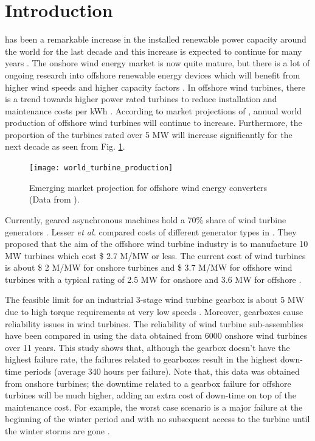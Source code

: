 \documentclass[final,peerreview,onecolumn]{IEEEtran}
\begin{document}


\section{Introduction}
 has been a remarkable increase in the installed renewable power capacity around the world for the last decade and this increase is expected to continue for many years \cite{Tong2010}. The onshore wind energy market is now quite mature, but there is a lot of ongoing research into offshore renewable energy devices which will benefit from higher wind speeds and higher capacity factors \cite{Tong2010}.  In offshore wind turbines, there is a trend towards higher power rated turbines to reduce installation and maintenance costs per kWh \cite{Bang2008}. According to market projections of \cite{offshore_wind_report2009}, annual world production of offshore wind turbines will continue to increase. Furthermore, the proportion of  the turbines rated over 5 MW will increase significantly for the next decade as seen from Fig. \ref{world_production}.

\begin{figure}[!h]
\centering
\texttt{[image: world\_turbine\_production]}
\caption{Emerging market projection for offshore wind energy converters (Data from \cite{offshore_wind_report2009}).}
\label{world_production}
\end{figure}


Currently, geared asynchronous machines hold a 70\% share of wind turbine generators \cite{Lesser2009}. Lesser \textit{et al.} compared costs of different generator types in \cite{Lesser2009}. They proposed that the aim of the offshore wind turbine industry is to manufacture 10 MW  turbines which cost \$ 2.7 M/MW or less. The current cost of wind turbines is about \$ 2 M/MW for onshore turbines and \$ 3.7 M/MW for offshore wind turbines with a typical rating of 2.5 MW for onshore and 3.6 MW for offshore \cite{Lesser2009}.

The feasible limit for an industrial 3-stage wind turbine gearbox is about 5 MW due to high torque requirements at very low speeds \cite{Lesser2009}. Moreover, gearboxes cause reliability issues in wind turbines. The reliability of wind turbine sub-assemblies have been compared in \cite{Spinato2009} using the data obtained from 6000 onshore wind turbines over 11 years. This study shows that, although the gearbox doesn't have the highest failure rate, the failures related to gearboxes result in the highest down-time periods (average 340 hours per failure). Note that, this data was obtained from onshore turbines; the downtime related to a gearbox failure for offshore turbines will be much higher, adding an extra cost of down-time on top of the maintenance cost. For example, the worst case scenario is a major failure at the beginning of the winter period and with no subsequent access to the turbine until the winter storms are gone \cite{Abrahamsen2010}.
\end{document}
